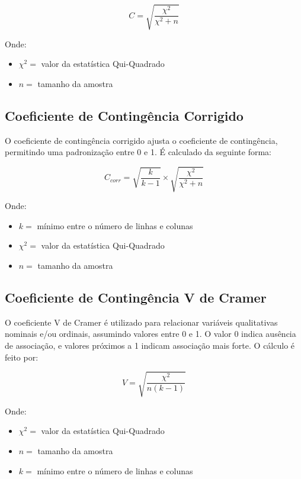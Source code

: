 \documentclass[
  portuguese,
]{estat/estat}
\providecommand{\tightlist}{%
  \setlength{\itemsep}{0pt}\setlength{\parskip}{0pt}}
\begin{document}
\[
C=\sqrt{\frac{\chi^2}{\chi^2+n}}
\]

Onde:

\begin{itemize}
\tightlist
\item
  \(\chi^2 =\) valor da estatística Qui-Quadrado
\item
  \(n =\) tamanho da amostra
\end{itemize}

\subsection{Coeficiente de Contingência
Corrigido}\label{coeficiente-de-continguxeancia-corrigido}

O coeficiente de contingência corrigido ajusta o coeficiente de
contingência, permitindo uma padronização entre 0 e 1. É calculado da
seguinte forma:

\[
C_{corr}= \sqrt{\frac{k}{k-1}} \times \sqrt{\frac{\chi^2}{\chi^2 + n}}
\]

Onde:

\begin{itemize}
\tightlist
\item
  \(k =\) mínimo entre o número de linhas e colunas
\item
  \(\chi^2 =\) valor da estatística Qui-Quadrado
\item
  \(n =\) tamanho da amostra
\end{itemize}

\subsection{Coeficiente de Contingência V de
Cramer}\label{coeficiente-de-continguxeancia-v-de-cramer}

O coeficiente V de Cramer é utilizado para relacionar variáveis
qualitativas nominais e/ou ordinais, assumindo valores entre 0 e 1. O
valor 0 indica ausência de associação, e valores próximos a 1 indicam
associação mais forte. O cálculo é feito por:

\[
V = \sqrt{\frac{\chi^2}{n(k-1)}}
\]

Onde:

\begin{itemize}
\tightlist
\item
  \(\chi^2 =\) valor da estatística Qui-Quadrado
\item
  \(n =\) tamanho da amostra
\item
  \(k =\) mínimo entre o número de linhas e colunas
\end{itemize}
\end{document}
